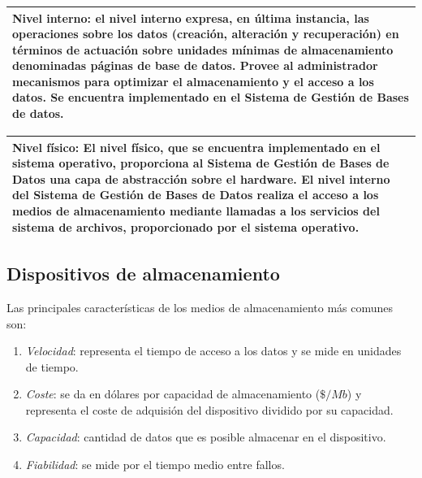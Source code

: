 \documentclass[10pt,a4paper,spanish]{report}
\begin{document}
\begin{center}
\begin{tabular}{|p{12cm}|}
\hline
\textcolor[rgb]{1,0.2,0.3}{\textbf{Nivel interno}}: el nivel interno expresa, en última instancia, las operaciones sobre los datos (creación, alteración y recuperación) en términos de actuación sobre unidades mínimas de almacenamiento denominadas páginas de base de datos. Provee al administrador mecanismos para optimizar el almacenamiento y el acceso a los datos. Se encuentra implementado en el Sistema de Gestión de Bases de datos. \\
\hline
\end{tabular}

\begin{tabular}{|p{12cm}|}
\hline
\textcolor[rgb]{1,0.2,0.3}{\textbf{Nivel físico}}: El nivel físico, que se encuentra implementado en el sistema operativo, proporciona al Sistema de Gestión de Bases de Datos una capa de abstracción sobre el hardware. El nivel interno del Sistema de Gestión de Bases de Datos realiza el acceso a los medios de almacenamiento mediante llamadas a los servicios del sistema de archivos, proporcionado por el sistema operativo. \\
\hline
\end{tabular}
\end{center}

\textcolor[rgb]{1,0.2,0.3}{\section{Dispositivos de almacenamiento}}
Las principales características de los medios de almacenamiento más comunes son:
\begin{enumerate}[$\heartsuit$]
    \item \textit{\textcolor[rgb]{1,0.2,0.3}{Velocidad}}: representa el tiempo de acceso a los datos y se mide en unidades de tiempo.
    \item \textit{\textcolor[rgb]{1,0.2,0.3}{Coste}}: se da en dólares por capacidad de almacenamiento ($\$/Mb$) y representa el coste de adquisión del dispositivo dividido por su capacidad.
    \item \textit{\textcolor[rgb]{1,0.2,0.3}{Capacidad}}: cantidad de datos que es posible almacenar en el dispositivo.
    \item \textit{\textcolor[rgb]{1,0.2,0.3}{Fiabilidad}}: se mide por el tiempo medio entre fallos.
\end{enumerate}
\end{document}
